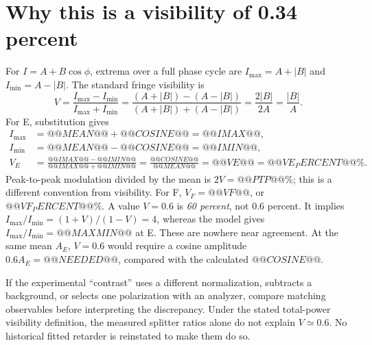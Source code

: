 \documentclass[11pt,a4paper]{article}
\begin{document}
\section{Why this is a visibility of 0.34 percent}
For $I=A+B\cos\phi$, extrema over a full phase cycle are
$I_{\max}=A+|B|$ and $I_{\min}=A-|B|$. The standard fringe visibility is
\begin{equation}
\boxed{V=\frac{I_{\max}-I_{\min}}{I_{\max}+I_{\min}}
=\frac{(A+|B|)-(A-|B|)}{(A+|B|)+(A-|B|)}
=\frac{2|B|}{2A}=\frac{|B|}{A}.}
\end{equation}
For E, substitution gives
\begin{align*}
I_{\max}&=@@MEAN@@+@@COSINE@@=@@IMAX@@,\\
I_{\min}&=@@MEAN@@-@@COSINE@@=@@IMIN@@,\\
V_E&=\frac{@@IMAX@@-@@IMIN@@}{@@IMAX@@+@@IMIN@@}
=\frac{@@COSINE@@}{@@MEAN@@}
=@@VE@@=\boxed{@@VE_PERCENT@@\%}.
\end{align*}
Peak-to-peak modulation divided by the mean is $2V=@@PTP@@\%$;
this is a different convention from visibility. For F, $V_F=@@VF@@$, or
$@@VF_PERCENT@@\%$. A value $V=0.6$ is \emph{60 percent}, not 0.6 percent.
It implies $I_{\max}/I_{\min}=(1+V)/(1-V)=4$, whereas the model gives
$I_{\max}/I_{\min}=@@MAXMIN@@$ at E. These are nowhere near agreement.
At the same mean $A_E$, $V=0.6$ would require a cosine amplitude $0.6A_E
=@@NEEDED@@$, compared with the calculated $@@COSINE@@$.

If the experimental ``contrast'' uses a different normalization, subtracts a
background, or selects one polarization with an analyzer, compare matching
observables before interpreting the discrepancy. Under the stated total-power
visibility definition, the measured splitter ratios alone do not explain
$V\simeq0.6$. No historical fitted retarder is reinstated to make them do so.
\end{document}
